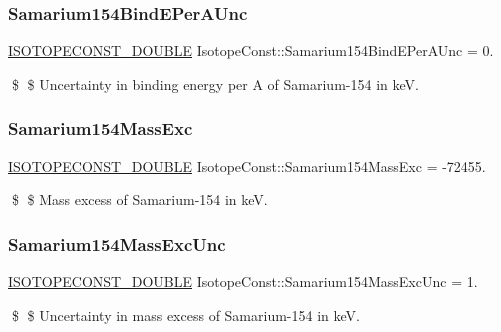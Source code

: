 \subsubsection{\texorpdfstring{Samarium154\+Bind\+E\+Per\+A\+Unc}{Samarium154BindEPerAUnc}}
{\footnotesize\ttfamily \mbox{\hyperlink{group___isotope_const-_macros_ga8f45a7272ce02c0b4c65c44636ed719a}{I\+S\+O\+T\+O\+P\+E\+C\+O\+N\+S\+T\+\_\+\+D\+O\+U\+B\+LE}} Isotope\+Const\+::\+Samarium154\+Bind\+E\+Per\+A\+Unc = 0.}

\$ \$ Uncertainty in binding energy per A of Samarium-\/154 in keV. \mbox{\label{group___isotope_const-_samarium-_sm154_ga38600c488f20d0e425d06bbd84632bcf}} 
\subsubsection{\texorpdfstring{Samarium154\+Mass\+Exc}{Samarium154MassExc}}
{\footnotesize\ttfamily \mbox{\hyperlink{group___isotope_const-_macros_ga8f45a7272ce02c0b4c65c44636ed719a}{I\+S\+O\+T\+O\+P\+E\+C\+O\+N\+S\+T\+\_\+\+D\+O\+U\+B\+LE}} Isotope\+Const\+::\+Samarium154\+Mass\+Exc = -\/72455.}

\$ \$ Mass excess of Samarium-\/154 in keV. \mbox{\label{group___isotope_const-_samarium-_sm154_ga837f24bd26dcb7db3aba86ae63b0d468}} 
\subsubsection{\texorpdfstring{Samarium154\+Mass\+Exc\+Unc}{Samarium154MassExcUnc}}
{\footnotesize\ttfamily \mbox{\hyperlink{group___isotope_const-_macros_ga8f45a7272ce02c0b4c65c44636ed719a}{I\+S\+O\+T\+O\+P\+E\+C\+O\+N\+S\+T\+\_\+\+D\+O\+U\+B\+LE}} Isotope\+Const\+::\+Samarium154\+Mass\+Exc\+Unc = 1.}

\$ \$ Uncertainty in mass excess of Samarium-\/154 in keV. \mbox{\label{group___isotope_const-_samarium-_sm154_ga279e1d56546868e46080f6e8612df7c4}} 
